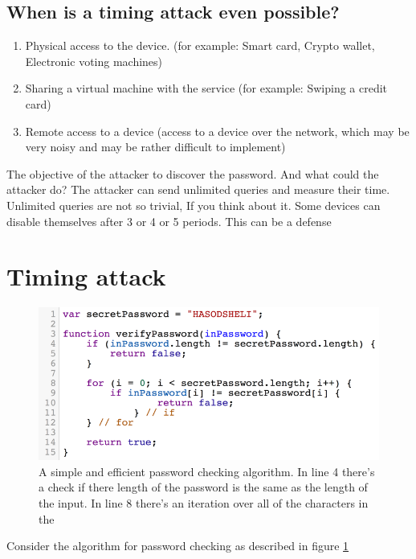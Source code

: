 \subsection{When is a timing attack even possible?}
\begin{enumerate}
    \item Physical access to the device.
    (for example: Smart card, Crypto wallet, Electronic voting machines)
    \item Sharing a virtual machine with the service
    (for example: Swiping a credit card)
    \item Remote access to a device (access to a device over the network, which may be very noisy and may be rather difficult to implement)
\end{enumerate}

The objective of the attacker to discover the password. And what could the attacker do? The attacker can send unlimited queries and measure their time. Unlimited queries are not so trivial, If you think about it. Some devices can disable themselves after 3 or 4 or 5 periods. This can be a defense \cite{ATM_bruteforce_block}

\section{Timing attack}

\begin{figure}[H]
    \centering
    \includegraphics{images/chapter_1/password_check_algo_1.png}
    \caption{A simple and efficient password checking algorithm.
    In line 4 there's a check if there length of the password is the same as the length of the input.
    In line 8 there's an iteration over all of the characters in the }
    \label{c1_fig_pass_check_1}
\end{figure}

Consider the algorithm for password checking as described in figure \ref{c1_fig_pass_check_1}

